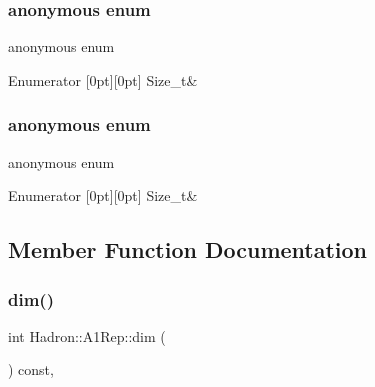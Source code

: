\subsubsection{\texorpdfstring{anonymous enum}{anonymous enum}}
{\footnotesize\ttfamily anonymous enum}

\begin{DoxyEnumFields}{Enumerator}
[0pt][0pt]{}\mbox{\label{structHadron_1_1A1Rep_a665dc3d5fcc68d8415b29e7b45107036a7aff2e8085a1de8589bd14144e70a564}} 
Size\+\_\+t&\\
\hline

\end{DoxyEnumFields}
\mbox{\label{structHadron_1_1A1Rep_acf07f9f1c986ecb977aa61714cd65f1b}} 
\subsubsection{\texorpdfstring{anonymous enum}{anonymous enum}}
{\footnotesize\ttfamily anonymous enum}

\begin{DoxyEnumFields}{Enumerator}
[0pt][0pt]{}\mbox{\label{structHadron_1_1A1Rep_a665dc3d5fcc68d8415b29e7b45107036a7aff2e8085a1de8589bd14144e70a564}} 
Size\+\_\+t&\\
\hline

\end{DoxyEnumFields}


\subsection{Member Function Documentation}
\mbox{\label{structHadron_1_1A1Rep_a4f7f61f8c9a5113c9407be6609cf7fbe}} 
\subsubsection{\texorpdfstring{dim()}{dim()}\hspace{0.1cm}{\footnotesize\ttfamily [1/3]}}
{\footnotesize\ttfamily int Hadron\+::\+A1\+Rep\+::dim (\begin{DoxyParamCaption}{ }\end{DoxyParamCaption}) const\hspace{0.3cm}{\ttfamily [inline]}, {\ttfamily [virtual]}}



